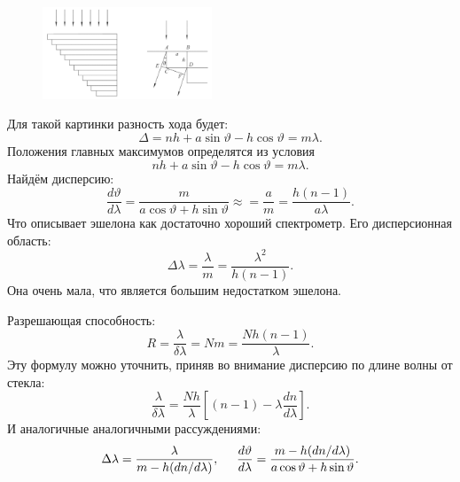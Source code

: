 
\begin{figure}[h]
    \centering
    \includegraphics[width=0.45\textwidth]{figures/s47_1.png}
\end{figure}
Для такой картинки разность хода будет:
\begin{equation*}
	\Delta = n h + a \sin \vartheta - h \cos \vartheta = m \lambda.
\end{equation*}
Положения главных максимумов определятся из условия
\begin{equation*}
	nh + a \sin \vartheta - h \cos \vartheta = m \lambda.
\end{equation*}
Найдём дисперсию:
\begin{equation*}
	\frac{d \vartheta}{d \lambda} = \frac{m}{a \cos \vartheta + h \sin \vartheta} \approx = \frac{a}{m} = \frac{h (n-1)}{a \lambda}.
\end{equation*}
Что описывает эшелона как достаточно хороший спектрометр. Его дисперсионная область:
\begin{equation*}
	\Delta \lambda = \frac{\lambda}{m} = \frac{\lambda^2}{h (n-1)}.
\end{equation*}
Она очень мала, что является большим недостатком эшелона.

Разрешающая способность: 
\begin{equation*}
	R = \frac{\lambda}{\delta\lambda} = N m = \frac{N h (n-1)}{\lambda}.
\end{equation*}
Эту формулу можно уточнить, приняв во внимание дисперсию по длине волны от стекла:
\begin{equation*}
	\frac{\lambda}{\delta\lambda} = \frac{N h}{\lambda} \left[(n-1) - \lambda \frac{d n}{d \lambda}\right].
\end{equation*}
И аналогичные аналогичными рассуждениями:
\begin{equation*}
	\Delta\lambda = \frac{\lambda}{m - h (d n / d\lambda)},
	\hspace{0.5 cm}
	\frac{d \vartheta}{d \lambda} = \frac{m - h (d n/d \lambda)}{a \cos \vartheta + h \sin \vartheta}.
\end{equation*}	